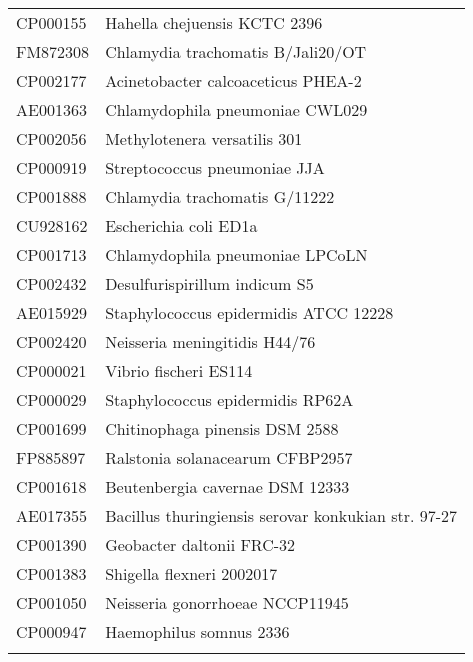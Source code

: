 \begin{longtable}{ll}
CP000155 & Hahella chejuensis KCTC 2396\\
FM872308 & Chlamydia trachomatis B/Jali20/OT\\
CP002177 & Acinetobacter calcoaceticus PHEA-2\\
AE001363 & Chlamydophila pneumoniae CWL029\\
CP002056 & Methylotenera versatilis 301\\
CP000919 & Streptococcus pneumoniae JJA\\
CP001888 & Chlamydia trachomatis G/11222\\
CU928162 & Escherichia coli ED1a\\
CP001713 & Chlamydophila pneumoniae LPCoLN\\
CP002432 & Desulfurispirillum indicum S5\\
AE015929 & Staphylococcus epidermidis ATCC 12228\\
CP002420 & Neisseria meningitidis H44/76\\
CP000021 & Vibrio fischeri ES114\\
CP000029 & Staphylococcus epidermidis RP62A\\
CP001699 & Chitinophaga pinensis DSM 2588\\
FP885897 & Ralstonia solanacearum CFBP2957\\
CP001618 & Beutenbergia cavernae DSM 12333\\
AE017355 & Bacillus thuringiensis serovar konkukian str. 97-27\\
CP001390 & Geobacter daltonii FRC-32\\
CP001383 & Shigella flexneri 2002017\\
CP001050 & Neisseria gonorrhoeae NCCP11945\\
CP000947 & Haemophilus somnus 2336\\
    \bottomrule
  \label{tab:addlabel}%
    \end{longtable}%
\endgroup%


